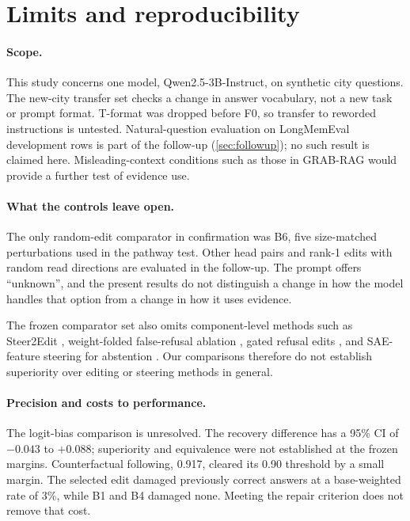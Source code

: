 \section{Limits and reproducibility}
\label{sec:limits}

\paragraph{Scope.}
This study concerns one model, Qwen2.5-3B-Instruct, on synthetic city questions. The new-city transfer set
checks a change in answer vocabulary, not a new task or prompt format. T-format was dropped before F0, so
transfer to reworded instructions is untested. Natural-question evaluation on LongMemEval development rows
is part of the follow-up (\cref{sec:followup}); no such result is claimed here. Misleading-context conditions
such as those in GRAB-RAG \citep{setiawan2026grabrag} would provide a further test of evidence use.

\paragraph{What the controls leave open.}
The only random-edit comparator in confirmation was B6, five size-matched perturbations used in the pathway
test. Other head pairs and rank-1 edits with random read directions are evaluated in the follow-up.
The prompt offers ``unknown'', and the present results do not distinguish a change in how the model handles
that option from a change in how it uses evidence.

The frozen comparator set also omits component-level methods such as Steer2Edit \citep{steer2edit2026},
weight-folded false-refusal ablation \citep{wang2025falserefusal}, gated refusal edits
\citep{hinkley2026paving}, and SAE-feature steering for abstention \citep{hasanov2026drno}.
Our comparisons therefore do not establish superiority over editing or steering methods in general.

\paragraph{Precision and costs to performance.}
The logit-bias comparison is unresolved. The recovery difference has a 95\% CI of $-0.043$ to $+0.088$;
superiority and equivalence were not established at the frozen margins. Counterfactual following, 0.917,
cleared its 0.90 threshold by a small margin. The selected edit damaged previously correct answers at a
base-weighted rate of 3\%, while B1 and B4 damaged none. Meeting the repair criterion does not remove that cost.

